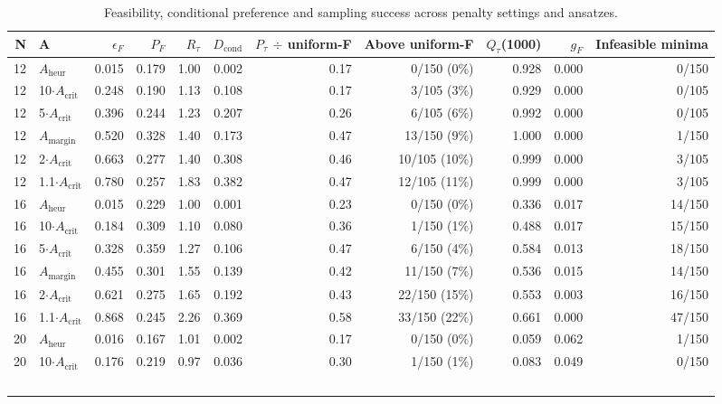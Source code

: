 \documentclass{ieeeaccess}
\begin{document}
\begin{table}[!t]
\centering
\scriptsize
\caption{Feasibility, conditional preference and sampling success across penalty settings and ansatzes.}
\label{tab:III}
\begin{tabular}{rlrrrrrrrrr}
\toprule
N & A & $\epsilon_{F}$ & $P_{F}$ & $R_{\tau}$ & $D_{\mathrm{cond}}$ & $P_{\tau}$ $\div$ uniform-F & Above uniform-F & $Q_{\tau}$(1000) & $g_{F}$ & Infeasible minima \\
\midrule
12 & $A_{\mathrm{heur}}$ & 0.015 & 0.179 & 1.00 & 0.002 & 0.17 & 0/150 (0\%) & 0.928 & 0.000 & 0/150 \\
12 & 10$\cdot$$A_{\mathrm{crit}}$ & 0.248 & 0.190 & 1.13 & 0.108 & 0.17 & 3/105 (3\%) & 0.929 & 0.000 & 0/105 \\
12 & 5$\cdot$$A_{\mathrm{crit}}$ & 0.396 & 0.244 & 1.23 & 0.207 & 0.26 & 6/105 (6\%) & 0.992 & 0.000 & 0/105 \\
12 & $A_{\mathrm{margin}}$ & 0.520 & 0.328 & 1.40 & 0.173 & 0.47 & 13/150 (9\%) & 1.000 & 0.000 & 1/150 \\
12 & 2$\cdot$$A_{\mathrm{crit}}$ & 0.663 & 0.277 & 1.40 & 0.308 & 0.46 & 10/105 (10\%) & 0.999 & 0.000 & 3/105 \\
12 & 1.1$\cdot$$A_{\mathrm{crit}}$ & 0.780 & 0.257 & 1.83 & 0.382 & 0.47 & 12/105 (11\%) & 0.999 & 0.000 & 3/105 \\
16 & $A_{\mathrm{heur}}$ & 0.015 & 0.229 & 1.00 & 0.001 & 0.23 & 0/150 (0\%) & 0.336 & 0.017 & 14/150 \\
16 & 10$\cdot$$A_{\mathrm{crit}}$ & 0.184 & 0.309 & 1.10 & 0.080 & 0.36 & 1/150 (1\%) & 0.488 & 0.017 & 15/150 \\
16 & 5$\cdot$$A_{\mathrm{crit}}$ & 0.328 & 0.359 & 1.27 & 0.106 & 0.47 & 6/150 (4\%) & 0.584 & 0.013 & 18/150 \\
16 & $A_{\mathrm{margin}}$ & 0.455 & 0.301 & 1.55 & 0.139 & 0.42 & 11/150 (7\%) & 0.536 & 0.015 & 14/150 \\
16 & 2$\cdot$$A_{\mathrm{crit}}$ & 0.621 & 0.275 & 1.65 & 0.192 & 0.43 & 22/150 (15\%) & 0.553 & 0.003 & 16/150 \\
16 & 1.1$\cdot$$A_{\mathrm{crit}}$ & 0.868 & 0.245 & 2.26 & 0.369 & 0.58 & 33/150 (22\%) & 0.661 & 0.000 & 47/150 \\
20 & $A_{\mathrm{heur}}$ & 0.016 & 0.167 & 1.01 & 0.002 & 0.17 & 0/150 (0\%) & 0.059 & 0.062 & 1/150 \\
20 & 10$\cdot$$A_{\mathrm{crit}}$ & 0.176 & 0.219 & 0.97 & 0.036 & 0.30 & 1/150 (1\%) & 0.083 & 0.049 & 0/150 \\
$$
\end{tabular}
\end{table}
\end{document}
